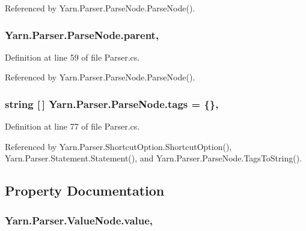 Referenced by Yarn.\-Parser.\-Parse\-Node.\-Parse\-Node().

\hypertarget{a00150_af313a82103fcc2ff5a177dbb06b92f7b}{
\subsubsection[{parent}]{ Yarn.\-Parser.\-Parse\-Node.\-parent\hspace{0.3cm}{\ttfamily [package]}, {\ttfamily [inherited]}}}\label{a00150_af313a82103fcc2ff5a177dbb06b92f7b}


Definition at line 59 of file Parser.\-cs.



Referenced by Yarn.\-Parser.\-Parse\-Node.\-Parse\-Node().

\hypertarget{a00150_a58b3a15788fd2d4127d73619dc6d04ae}{
\subsubsection[{tags}]{\setlength{\rightskip}{0pt plus 5cm}string \mbox{[}$\,$\mbox{]} Yarn.\-Parser.\-Parse\-Node.\-tags = \{\}\hspace{0.3cm}{\ttfamily [package]}, {\ttfamily [inherited]}}}\label{a00150_a58b3a15788fd2d4127d73619dc6d04ae}


Definition at line 77 of file Parser.\-cs.



Referenced by Yarn.\-Parser.\-Shortcut\-Option.\-Shortcut\-Option(), Yarn.\-Parser.\-Statement.\-Statement(), and Yarn.\-Parser.\-Parse\-Node.\-Tags\-To\-String().



\subsection{Property Documentation}
\hypertarget{a00190_a51ab5939344f9bfa21181c02cf0e341d}{
\subsubsection[{value}]{ Yarn.\-Parser.\-Value\-Node.\-value\hspace{0.3cm}{\ttfamily [get]}, {\ttfamily [set]}}}\label{a00190_a51ab5939344f9bfa21181c02cf0e341d}


